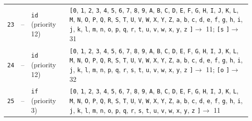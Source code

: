 \documentclass[11pt,a4paper]{article}
\newcommand{\opensymbolset}{\texttt{[}}
\newcommand{\closesymbolset}{\texttt{]}}
\begin{document}
\begin{landscape}
\begin{longtable}{
    >{\centering\arraybackslash}p{0.8cm}
    >{\centering\arraybackslash}p{0.7cm}
    >{\raggedright\arraybackslash}p{3.7cm}
    >{\raggedright\arraybackslash}p{18.1cm}
}
\texttt{23} & -- & \texttt{id} (priority 12) & \opensymbolset \texttt{0}, \texttt{1}, \texttt{2}, \texttt{3}, \texttt{4}, \texttt{5}, \texttt{6}, \texttt{7}, \texttt{8}, \texttt{9}, \texttt{A}, \texttt{B}, \texttt{C}, \texttt{D}, \texttt{E}, \texttt{F}, \texttt{G}, \texttt{H}, \texttt{I}, \texttt{J}, \texttt{K}, \texttt{L}, \texttt{M}, \texttt{N}, \texttt{O}, \texttt{P}, \texttt{Q}, \texttt{R}, \texttt{S}, \texttt{T}, \texttt{U}, \texttt{V}, \texttt{W}, \texttt{X}, \texttt{Y}, \texttt{Z}, \texttt{a}, \texttt{b}, \texttt{c}, \texttt{d}, \texttt{e}, \texttt{f}, \texttt{g}, \texttt{h}, \texttt{i}, \texttt{j}, \texttt{k}, \texttt{l}, \texttt{m}, \texttt{n}, \texttt{o}, \texttt{p}, \texttt{q}, \texttt{r}, \texttt{t}, \texttt{u}, \texttt{v}, \texttt{w}, \texttt{x}, \texttt{y}, \texttt{z} \closesymbolset $\to$ 11; \opensymbolset \texttt{s} \closesymbolset $\to$ 31 \\
\texttt{24} & -- & \texttt{id} (priority 12) & \opensymbolset \texttt{0}, \texttt{1}, \texttt{2}, \texttt{3}, \texttt{4}, \texttt{5}, \texttt{6}, \texttt{7}, \texttt{8}, \texttt{9}, \texttt{A}, \texttt{B}, \texttt{C}, \texttt{D}, \texttt{E}, \texttt{F}, \texttt{G}, \texttt{H}, \texttt{I}, \texttt{J}, \texttt{K}, \texttt{L}, \texttt{M}, \texttt{N}, \texttt{O}, \texttt{P}, \texttt{Q}, \texttt{R}, \texttt{S}, \texttt{T}, \texttt{U}, \texttt{V}, \texttt{W}, \texttt{X}, \texttt{Y}, \texttt{Z}, \texttt{a}, \texttt{b}, \texttt{c}, \texttt{d}, \texttt{e}, \texttt{f}, \texttt{g}, \texttt{h}, \texttt{i}, \texttt{j}, \texttt{k}, \texttt{l}, \texttt{m}, \texttt{n}, \texttt{p}, \texttt{q}, \texttt{r}, \texttt{s}, \texttt{t}, \texttt{u}, \texttt{v}, \texttt{w}, \texttt{x}, \texttt{y}, \texttt{z} \closesymbolset $\to$ 11; \opensymbolset \texttt{o} \closesymbolset $\to$ 32 \\
\texttt{25} & -- & \texttt{if} (priority 3) & \opensymbolset \texttt{0}, \texttt{1}, \texttt{2}, \texttt{3}, \texttt{4}, \texttt{5}, \texttt{6}, \texttt{7}, \texttt{8}, \texttt{9}, \texttt{A}, \texttt{B}, \texttt{C}, \texttt{D}, \texttt{E}, \texttt{F}, \texttt{G}, \texttt{H}, \texttt{I}, \texttt{J}, \texttt{K}, \texttt{L}, \texttt{M}, \texttt{N}, \texttt{O}, \texttt{P}, \texttt{Q}, \texttt{R}, \texttt{S}, \texttt{T}, \texttt{U}, \texttt{V}, \texttt{W}, \texttt{X}, \texttt{Y}, \texttt{Z}, \texttt{a}, \texttt{b}, \texttt{c}, \texttt{d}, \texttt{e}, \texttt{f}, \texttt{g}, \texttt{h}, \texttt{i}, \texttt{j}, \texttt{k}, \texttt{l}, \texttt{m}, \texttt{n}, \texttt{o}, \texttt{p}, \texttt{q}, \texttt{r}, \texttt{s}, \texttt{t}, \texttt{u}, \texttt{v}, \texttt{w}, \texttt{x}, \texttt{y}, \texttt{z} \closesymbolset $\to$ 11 \\

\end{longtable}
\end{landscape}
\end{document}
